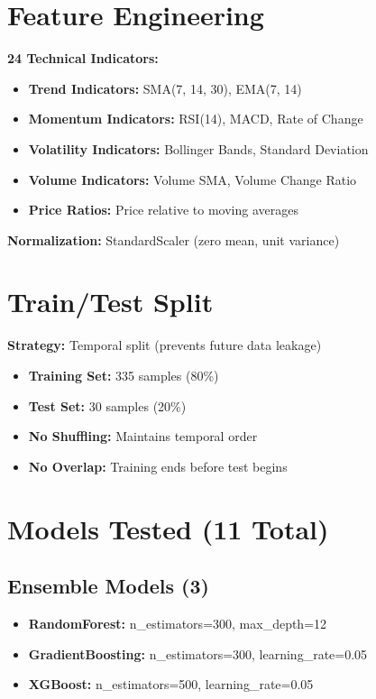 \section{Feature Engineering}

\textbf{24 Technical Indicators:}
\begin{itemize}
    \item \textbf{Trend Indicators:} SMA(7, 14, 30), EMA(7, 14)
    \item \textbf{Momentum Indicators:} RSI(14), MACD, Rate of Change
    \item \textbf{Volatility Indicators:} Bollinger Bands, Standard Deviation
    \item \textbf{Volume Indicators:} Volume SMA, Volume Change Ratio
    \item \textbf{Price Ratios:} Price relative to moving averages
\end{itemize}

\textbf{Normalization:} StandardScaler (zero mean, unit variance)

\section{Train/Test Split}

\textbf{Strategy:} Temporal split (prevents future data leakage)
\begin{itemize}
    \item \textbf{Training Set:} 335 samples (80\%)
    \item \textbf{Test Set:} 30 samples (20\%)
    \item \textbf{No Shuffling:} Maintains temporal order
    \item \textbf{No Overlap:} Training ends before test begins
\end{itemize}

\section{Models Tested (11 Total)}

\subsection{Ensemble Models (3)}
\begin{itemize}
    \item \textbf{RandomForest:} n\_estimators=300, max\_depth=12
    \item \textbf{GradientBoosting:} n\_estimators=300, learning\_rate=0.05
    \item \textbf{XGBoost:} n\_estimators=500, learning\_rate=0.05
\end{itemize}

